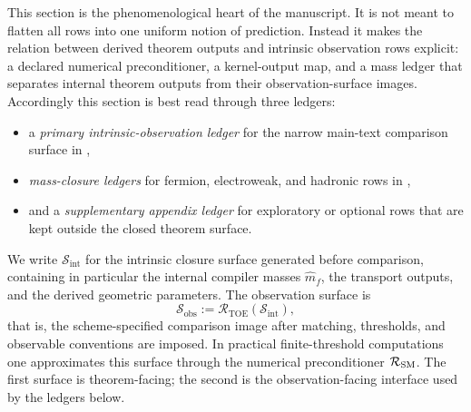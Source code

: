 This section is the phenomenological heart of the manuscript. It is not meant to flatten all
rows into one uniform notion of prediction. Instead it makes the relation between derived theorem
outputs and intrinsic observation rows explicit: a declared numerical preconditioner, a
kernel-output map, and a mass ledger that separates internal theorem outputs from their
observation-surface images.
Accordingly this section is best read through three ledgers:
\begin{itemize}[leftmargin=1.5em, topsep=3pt, itemsep=2pt]
    \item a \emph{primary intrinsic-observation ledger} for the narrow main-text comparison surface in ,
    \item \emph{mass-closure ledgers} for fermion, electroweak, and hadronic rows in ,
    \item and a \emph{supplementary appendix ledger} for exploratory or optional rows that are kept outside the closed theorem surface.
\end{itemize}

\begin{definition}
\label{def:intrinsic-observation-surfaces}
We write $\mathcal S_{\mathrm{int}}$ for the intrinsic closure surface generated before
comparison, containing in particular the internal compiler masses $\hat m_f$, the transport
outputs, and the derived geometric parameters. The observation surface is
\[
\mathcal S_{\mathrm{obs}}:=\mathcal R_{\mathrm{TOE}}(\mathcal S_{\mathrm{int}}),
\]
that is, the scheme-specified comparison image after matching, thresholds, and observable
conventions are imposed. In practical finite-threshold computations one approximates this surface
through the numerical preconditioner $\mathcal R_{\mathrm{SM}}$. The first surface is theorem-facing; the
second is the observation-facing interface used by the ledgers below.
\end{definition}

